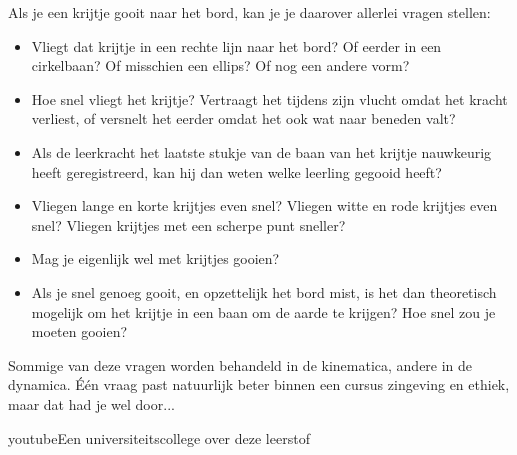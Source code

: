 \documentclass{ximera}
\begin{document}
\begin{example}
Als je een krijtje gooit naar het bord, kan je je daarover allerlei vragen stellen:
\begin{itemize}
\item Vliegt dat krijtje in een rechte lijn naar het bord? Of eerder in een cirkelbaan? Of misschien een ellips? Of nog een andere vorm? 
\item Hoe snel vliegt het krijtje? Vertraagt het tijdens zijn vlucht omdat het kracht verliest, of versnelt het eerder omdat het ook wat naar beneden valt? 
\item Als de leerkracht het laatste stukje van de baan van het krijtje nauwkeurig heeft geregistreerd, kan hij dan weten welke leerling gegooid heeft?
\item Vliegen lange en korte krijtjes even snel? Vliegen witte en rode krijtjes even snel? Vliegen krijtjes met een scherpe punt sneller?
\item Mag je eigenlijk wel met krijtjes gooien?
\item Als je snel genoeg gooit, en opzettelijk het bord mist, is het dan theoretisch mogelijk om het krijtje in een baan om de aarde te krijgen? Hoe snel zou je moeten gooien? 
\end{itemize}  

Sommige van deze vragen worden behandeld in de kinematica, andere in de dynamica. 
Één vraag past natuurlijk beter binnen een cursus zingeving en ethiek, maar dat had je wel door... 

\end{example}

\begin{expandable}{youtube}{Een universiteitscollege over deze leerstof}
\end{expandable}
\end{document}
